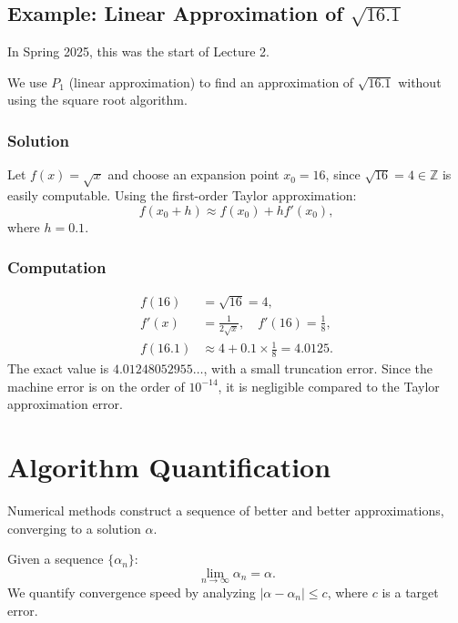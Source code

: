 \subsection{Example: Linear Approximation of $\sqrt{16.1}$}
\begin{greenquote}
  In Spring 2025, this was the start of Lecture 2.
\end{greenquote}

We use $P_1$ (linear approximation) to find an approximation of $\sqrt{16.1}$
without using the square root algorithm.

\subsubsection{Solution}
Let $f(x) = \sqrt{x}$ and choose an expansion point $x_0 = 16$, since 
$\sqrt{16} = 4 \in \mathbb{Z}$ is easily computable. Using the first-order 
Taylor approximation:
\begin{equation*}
    f(x_0 + h) \approx f(x_0) + h f'(x_0),
\end{equation*}
where $h = 0.1$.

\subsubsection{Computation}
\begin{align*}
    f(16) &= \sqrt{16} = 4, \\
    f'(x) &= \frac{1}{2\sqrt{x}}, \quad f'(16) = \frac{1}{8}, \\
    f(16.1) &\approx 4 + 0.1 \times \frac{1}{8} = 4.0125.
\end{align*}
The exact value is $4.01248052955\dots$, with a small truncation error.
Since the machine error is on the order of $10^{-14}$, it is negligible compared 
to the Taylor approximation error.

\section{Algorithm Quantification}

Numerical methods construct a sequence of better and better approximations, 
converging to a solution $\alpha$.

Given a sequence $\{\alpha_n\}$:
\begin{equation*}
    \lim_{n\to\infty} \alpha_n = \alpha.
\end{equation*}
We quantify convergence speed by analyzing $|\alpha - \alpha_n| \leq c$, where 
$c$ is a target error.


